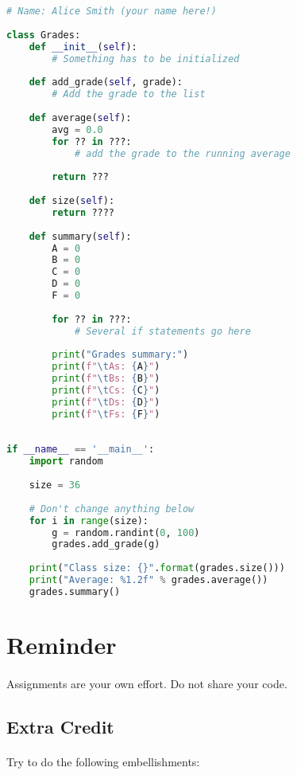 \documentclass[letter,10pt]{article}
\begin{document}
    \begin{lstlisting}[language=python]
# Name: Alice Smith (your name here!)
        
class Grades:
    def __init__(self):
        # Something has to be initialized
    
    def add_grade(self, grade):
        # Add the grade to the list
    
    def average(self):
        avg = 0.0
        for ?? in ???:
            # add the grade to the running average
    
        return ???
    
    def size(self):
        return ????
    
    def summary(self):
        A = 0
        B = 0
        C = 0
        D = 0
        F = 0
    
        for ?? in ???:
            # Several if statements go here
    
        print("Grades summary:")
        print(f"\tAs: {A}")
        print(f"\tBs: {B}")
        print(f"\tCs: {C}")
        print(f"\tDs: {D}")
        print(f"\tFs: {F}")
    
    
if __name__ == '__main__':
    import random
    
    size = 36
    
    # Don't change anything below
    for i in range(size):
        g = random.randint(0, 100)
        grades.add_grade(g)
    
    print("Class size: {}".format(grades.size()))
    print("Average: %1.2f" % grades.average())
    grades.summary()
    \end{lstlisting}
    
    \section*{Reminder}
    \paragraph{}Assignments are your own effort. Do not share your code.
    
    \subsection*{Extra Credit}
    \paragraph{}Try to do the following embellishments:
    
\end{document}
